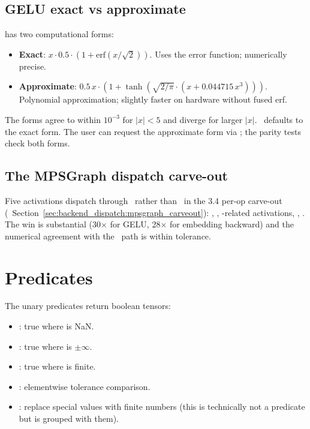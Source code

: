 \subsection{GELU exact vs approximate}
\label{ssec:unary_functions:gelu_modes}

 has two computational forms:

\begin{itemize}
  \item \textbf{Exact}: $x \cdot 0.5 \cdot (1 + \text{erf}(x /
    \sqrt{2}))$. Uses the error function; numerically precise.
  \item \textbf{Approximate}: $0.5\, x \cdot (1 + \tanh(\sqrt{2/\pi}
    \cdot (x + 0.044715\, x^3)))$. Polynomial approximation; slightly
    faster on hardware without fused erf.
\end{itemize}

The forms agree to within \(10^{-3}\) for \(|x| < 5\) and diverge
for larger \(|x|\). \Lucid\ defaults to the exact form. The user
can request the approximate form via
; the parity tests
check both forms.

\subsection{The MPSGraph dispatch carve-out}
\label{ssec:unary_functions:mpsgraph_carveout}

Five activations dispatch through \MPSGraph\ rather than \MLX\ in
the 3.4 per-op carve-out
(~Section~\ref{sec:backend_dispatch:mpsgraph_carveout}):
, , -related activations,
, . The win is
substantial (30$\times$ for GELU, 28$\times$ for embedding
backward) and the numerical agreement with the \MLX\ path is
within tolerance.

\section{Predicates}
\label{sec:unary_functions:predicates}

The unary predicates return boolean tensors:

\begin{itemize}
  \item {}: true where  is NaN.
  \item {}: true where  is \(\pm\infty\).
  \item {}: true where  is finite.
  \item {}: elementwise tolerance
    comparison.
  \item {}: replace
    special values with finite numbers (this is technically not a
    predicate but is grouped with them).
\end{itemize}

